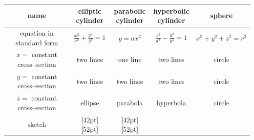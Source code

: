 \vfill
\noindent
\renewcommand{\arraystretch}{1.5}
\begin{tabular}{ | c | c | c | c | c |}
  \hline
  name & \parbox[c]{1.8cm}{\smallskip elliptic\\cylinder}
       & \parbox[c]{1.8cm}{\smallskip parabolic\\cylinder} 
       & \parbox[c]{1.8cm}{\smallskip hyperbolic\\cylinder} 
       & sphere \\[0.1in]
  \hline
  \parbox[c]{2.75cm}{\smallskip equation in\\standard form} 
             & $\frac{x^2}{a^2}+\frac{y^2}{b^2}=1$
             & $y=ax^2$ 
             & $\frac{x^2}{a^2}-\frac{y^2}{b^2}=1$
             & $x^2+y^2+z^2=r^2$\\[0.1in]
  \hline
  \parbox[c]{2.75cm}{\smallskip $x=$ constant \\cross--section} 
            & two lines 
            & one line 
            & two lines 
            & circle \\[0.1in]
  \hline
  \parbox[c]{2.75cm}{\smallskip $y=$ constant \\cross--section} 
            & two lines
            & two lines
            & two lines 
            & circle \\[0.1in]
  \hline
  \parbox[c]{2.75cm}{\smallskip $z=$ constant \\cross--section} 
            & ellipse
            & parabola 
            & hyperbola 
            & circle \\[0.1in]
  \hline
  sketch 
     & \raisebox{-45pt}[42pt][52pt]
              {  }
     & \raisebox{-47pt}[42pt][52pt]
             {}

\end{tabular}
